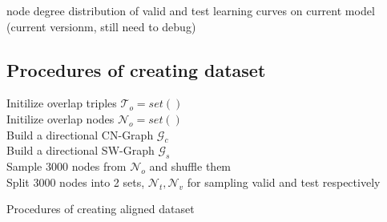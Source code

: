 node degree distribution of valid and test 
learning curves on current model (current versionm, still need to debug)


\subsection{Procedures of creating dataset}
\clearpage
\begin{algorithm}[H]
    \SetAlgoLined
    \LinesNumbered
    Initilize overlap triples $\mathcal{T}_o= set()$  \\
    Initilize overlap nodes $\mathcal{N}_{o} = set()$  \\
    Build a directional CN-Graph $\mathcal{G}_c$ \\
    Build a directional SW-Graph $\mathcal{G}_s$ \\
     {
         {
        } 
    }
    Sample 3000 nodes from $\mathcal{N}_o$ and shuffle them \\
    Split 3000 nodes into 2 sets, $\mathcal{N}_t, \mathcal{N}_v$ for sampling valid and test respectively \\

    \caption{\label{algo:create_alignment_dataset} Procedures of creating aligned dataset}
\end{algorithm}

